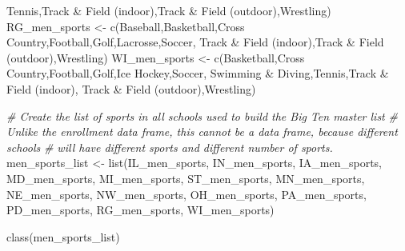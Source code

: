 \documentclass[
]{article}
\newenvironment{Shaded}{\begin{snugshade}}{\end{snugshade}}
\newcommand{\CommentTok}[1]{\textcolor[rgb]{0.56,0.35,0.01}{\textit{#1}}}
\newcommand{\FunctionTok}[1]{\textcolor[rgb]{0.00,0.00,0.00}{#1}}
\newcommand{\NormalTok}[1]{#1}
\newcommand{\OtherTok}[1]{\textcolor[rgb]{0.56,0.35,0.01}{#1}}
\newcommand{\StringTok}[1]{\textcolor[rgb]{0.31,0.60,0.02}{#1}}
\begin{document}
\begin{Shaded}
\begin{Highlighting}[]
                   \StringTok{\textquotesingle{}Tennis\textquotesingle{}}\NormalTok{,}\StringTok{\textquotesingle{}Track \& Field (indoor)\textquotesingle{}}\NormalTok{,}\StringTok{\textquotesingle{}Track \& Field (outdoor)\textquotesingle{}}\NormalTok{,}\StringTok{\textquotesingle{}Wrestling\textquotesingle{}}\NormalTok{)}
\NormalTok{RG\_men\_sports }\OtherTok{\textless{}{-}} \FunctionTok{c}\NormalTok{(}\StringTok{\textquotesingle{}Baseball\textquotesingle{}}\NormalTok{,}\StringTok{\textquotesingle{}Basketball\textquotesingle{}}\NormalTok{,}\StringTok{\textquotesingle{}Cross Country\textquotesingle{}}\NormalTok{,}\StringTok{\textquotesingle{}Football\textquotesingle{}}\NormalTok{,}\StringTok{\textquotesingle{}Golf\textquotesingle{}}\NormalTok{,}\StringTok{\textquotesingle{}Lacrosse\textquotesingle{}}\NormalTok{,}\StringTok{\textquotesingle{}Soccer\textquotesingle{}}\NormalTok{,}
                   \StringTok{\textquotesingle{}Track \& Field (indoor)\textquotesingle{}}\NormalTok{,}\StringTok{\textquotesingle{}Track \& Field (outdoor)\textquotesingle{}}\NormalTok{,}\StringTok{\textquotesingle{}Wrestling\textquotesingle{}}\NormalTok{)}
\NormalTok{WI\_men\_sports }\OtherTok{\textless{}{-}} \FunctionTok{c}\NormalTok{(}\StringTok{\textquotesingle{}Basketball\textquotesingle{}}\NormalTok{,}\StringTok{\textquotesingle{}Cross Country\textquotesingle{}}\NormalTok{,}\StringTok{\textquotesingle{}Football\textquotesingle{}}\NormalTok{,}\StringTok{\textquotesingle{}Golf\textquotesingle{}}\NormalTok{,}\StringTok{\textquotesingle{}Ice Hockey\textquotesingle{}}\NormalTok{,}\StringTok{\textquotesingle{}Soccer\textquotesingle{}}\NormalTok{,}
                   \StringTok{\textquotesingle{}Swimming \& Diving\textquotesingle{}}\NormalTok{,}\StringTok{\textquotesingle{}Tennis\textquotesingle{}}\NormalTok{,}\StringTok{\textquotesingle{}Track \& Field (indoor)\textquotesingle{}}\NormalTok{,}
                   \StringTok{\textquotesingle{}Track \& Field (outdoor)\textquotesingle{}}\NormalTok{,}\StringTok{\textquotesingle{}Wrestling\textquotesingle{}}\NormalTok{)}

\CommentTok{\# Create the list of sports in all schools used to build the Big \textasciigrave{}Ten master list\textasciigrave{}}
\CommentTok{\# Unlike the enrollment data frame, this cannot be a data frame, because different schools}
\CommentTok{\# will have different sports and different number of sports.}
\NormalTok{men\_sports\_list }\OtherTok{\textless{}{-}} \FunctionTok{list}\NormalTok{(IL\_men\_sports, IN\_men\_sports, IA\_men\_sports, MD\_men\_sports,}
\NormalTok{                        MI\_men\_sports, ST\_men\_sports, MN\_men\_sports, NE\_men\_sports,}
\NormalTok{                        NW\_men\_sports, OH\_men\_sports, PA\_men\_sports, PD\_men\_sports,}
\NormalTok{                        RG\_men\_sports, WI\_men\_sports)}


\FunctionTok{class}\NormalTok{(men\_sports\_list)}
\end{Highlighting}
\end{Shaded}
\end{document}
